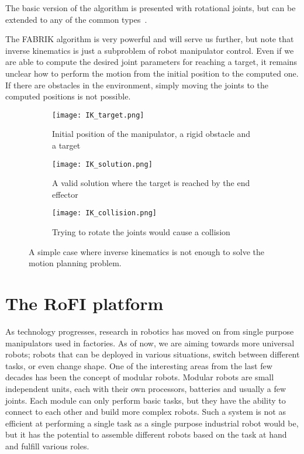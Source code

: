 The basic version of the algorithm is presented with rotational joints, but can be extended to any of the common types~\cite{fabrikConstraints}.

The FABRIK algorithm is very powerful and will serve us further, but note that inverse kinematics is just a subproblem of robot manipulator control. Even if we are able to compute the desired joint parameters for reaching a target, it remains unclear how to perform the motion from the initial position to the computed one. If there are obstacles in the environment, simply moving the joints to the computed positions is not possible.

\begin{figure}
\centering
\begin{subfigure}{.32\textwidth}
  \centering
  \texttt{[image: IK\_target.png]}
  \caption{Initial position of the manipulator, a rigid obstacle and a target}
\end{subfigure}%
\begin{subfigure}{.32\textwidth}
  \centering
  \texttt{[image: IK\_solution.png]}
  \caption{A valid solution where the target is reached by the end effector}
\end{subfigure}%
\begin{subfigure}{.32\textwidth}
  \centering
  \texttt{[image: IK\_collision.png]}
  \caption{Trying to rotate the joints would cause a collision}
\end{subfigure}
\caption{A simple case where inverse kinematics is not enough to solve the motion planning problem.}\label{fig:ikcoll}
\end{figure}

\newpage
\section{The RoFI platform}

As technology progresses, research in robotics has moved on from single purpose manipulators used in factories. As of now, we are aiming towards more universal robots; robots that can be deployed in various situations, switch between different tasks, or even change shape. One of the interesting areas from the last few decades has been the concept of modular robots. Modular robots are small independent units, each with their own processors, batteries and usually a few joints. Each module can only perform basic tasks, but they have the ability to connect to each other and build more complex robots. Such a system is not as efficient at performing a single task as a single purpose industrial robot would be, but it has the potential to assemble different robots based on the task at hand and fulfill various roles.


